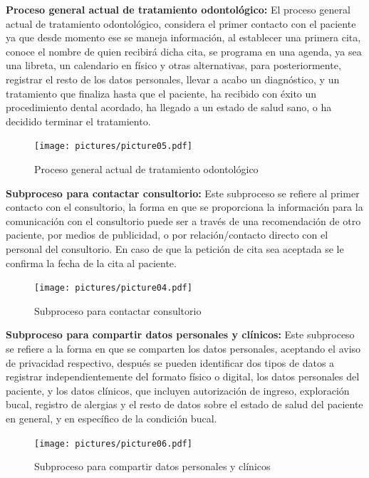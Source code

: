 \noindent\textbf{Proceso general actual de tratamiento odontológico:} El proceso general actual de tratamiento odontológico, considera el primer contacto con el paciente ya que desde momento ese se maneja información, al establecer una primera cita, conoce el nombre de quien recibirá dicha cita, se programa en una agenda, ya sea una libreta, un calendario en físico y otras alternativas, para posteriormente, registrar el resto de los datos personales, llevar a acabo un diagnóstico, y un tratamiento que finaliza hasta que el paciente, ha recibido con éxito un procedimiento dental acordado, ha llegado a un estado de salud sano, o ha decidido terminar el tratamiento.

\begin{figure}[H]
\centerline{\texttt{[image: pictures/picture05.pdf]}}
\caption{Proceso general actual de tratamiento odontológico}
\end{figure}

\noindent\textbf{Subproceso para contactar consultorio:} Este subproceso se refiere al primer contacto con el consultorio, la forma en que se proporciona la información para la comunicación con el consultorio puede ser a través de una recomendación de otro paciente, por medios de publicidad, o por relación/contacto directo con el personal del consultorio. En caso de que la petición de cita sea aceptada se le confirma la fecha de la cita al paciente.

\begin{figure}[H]
\centering
\centerline{ \texttt{[image: pictures/picture04.pdf]}}
\caption{Subproceso para contactar consultorio}
\end{figure}

\noindent\textbf{Subproceso para compartir datos personales y clínicos:} Este subproceso se refiere a la forma en que se comparten los datos personales, aceptando el aviso de privacidad respectivo, después se pueden identificar dos tipos de datos a registrar independientemente del formato físico o digital, los datos personales del paciente, y los datos clínicos, que incluyen autorización de ingreso, exploración bucal, registro de alergias y el resto de datos sobre el estado de salud del paciente en general, y en específico de la condición bucal.


\begin{figure}[H]
\centering
\centerline{ \texttt{[image: pictures/picture06.pdf]}}
\caption{Subproceso para compartir datos personales y clínicos}
\end{figure}

